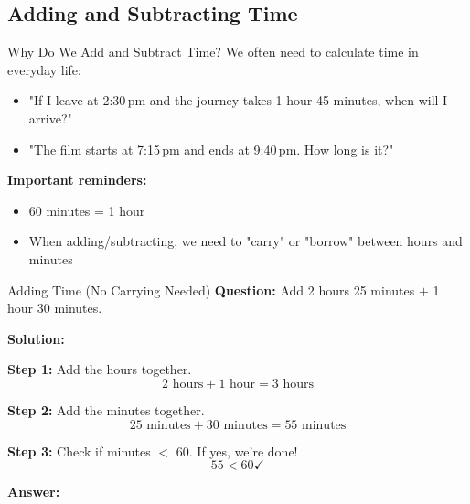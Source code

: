 \documentclass[12pt,a4paper]{article}
\begin{document}
\subsection{Adding and Subtracting Time}

\begin{conceptbox}{Why Do We Add and Subtract Time?}
We often need to calculate time in everyday life:
\begin{itemize}[leftmargin=*]
\item "If I leave at 2:30\,pm and the journey takes 1 hour 45 minutes, when will I arrive?"
\item "The film starts at 7:15\,pm and ends at 9:40\,pm. How long is it?"
\end{itemize}

\textbf{Important reminders:}
\begin{itemize}[leftmargin=*]
\item 60 minutes = 1 hour
\item When adding/subtracting, we need to "carry" or "borrow" between hours and minutes
\end{itemize}
\end{conceptbox}

\begin{examplebox}{Adding Time (No Carrying Needed)}
\textbf{Question:} Add 2 hours 25 minutes $+$ 1 hour 30 minutes.

\textbf{Solution:}

\textbf{Step 1:} Add the hours together.
\[2\text{ hours} + 1\text{ hour} = 3\text{ hours}\]

\textbf{Step 2:} Add the minutes together.
\[25\text{ minutes} + 30\text{ minutes} = 55\text{ minutes}\]

\textbf{Step 3:} Check if minutes $<$ 60. If yes, we're done!
\[55 < 60 \checkmark\]

\textbf{Answer:} 
\end{examplebox}
\end{document}
